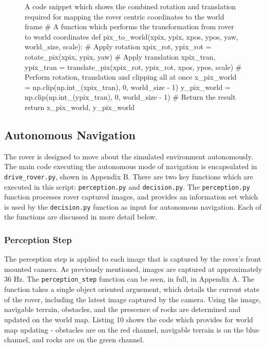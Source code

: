 \documentclass[a4paper]{article}
\begin{document}
\begin{figure}[h]\scriptsize
\begin{sexylisting}{A code snippet which shows the combined rotation and translation required for mapping the rover centric coordinates to the world frame}
# A function which performs the transformation from rover to world coordinates
def pix_to_world(xpix, ypix, xpos, ypos, yaw, world_size, scale):
    # Apply rotation
    xpix_rot, ypix_rot = rotate_pix(xpix, ypix, yaw)
    # Apply translation
    xpix_tran, ypix_tran = translate_pix(xpix_rot, ypix_rot, xpos, ypos, scale)
    # Perform rotation, translation and clipping all at once
    x_pix_world = np.clip(np.int_(xpix_tran), 0, world_size - 1)
    y_pix_world = np.clip(np.int_(ypix_tran), 0, world_size - 1)
    # Return the result
    return x_pix_world, y_pix_world
\end{sexylisting}
\end{figure}



\subsection{Autonomous Navigation}
The rover is designed to move about the simulated environment autonomously. The main code executing the autonomous mode of navigation is encapsulated in \verb|drive_rover.py|, shown in Appendix B. There are two key functions which are executed in this script: \verb|perception.py| and \verb|decision.py|. The \verb|perception.py| function processes rover captured images, and provides an information set which is used by the \verb|decision.py| function as input for autonomous navigation. Each of the functions are discussed in more detail below.

\subsubsection{Perception Step}
The perception step is applied to each image that is captured by the rover's front mounted camera. As previously mentioned, images are captured at approximately 36 $\si{\hertz}$. The \verb|perception_step| function can be seen, in full, in Appendix A. The function takes a single object oriented arguement, which details the current state of the rover, including the latest image captured by the camera. Using the image, navigable terrain, obstacles, and the prescence of rocks are determined and updated on the world map. Listing 10 shows the code which provides for world map updating - obstacles are on the red channel, navigable terrain is on the blue channel, and rocks are on the green channel.
\end{document}
